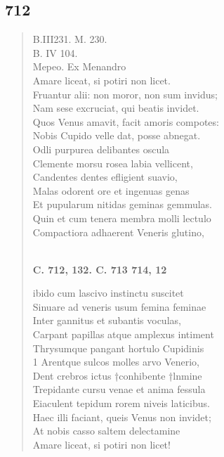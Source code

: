 \documentclass[11pt, a4paper]{report}
\begin{document}
            \subsection*{712}
      \begin{verse}
      B.III231. M. 230. \\ B. IV 104. \\ Mepeo. Ex Menandro \\ Amare liceat, si potiri non licet. \\ Fruantur alii: non moror, non sum invidus; \\ Nam sese excruciat, qui beatis invidet. \\ Quos Venus amavit, facit amoris compotes: \\ Nobis Cupido velle dat, posse abnegat. \\ Odli purpurea delibantes oscula \\ Clemente morsu rosea labia vellicent, \\ Candentes dentes efligient suavio, \\ Malas odorent ore et ingenuas genas \\ Et pupularum nitidas geminas gemmulas. \\ Quin et cum tenera membra molli lectulo \\ Compactiora adhaerent Veneris glutino, \\ 
        ﻿\pagebreak 
    \begin{center} \textbf{C. 712, 132. C. 713 714, 12} \end{center} \marginpar{[79]} ibido cum lascivo instinctu suscitet \\ Sinuare ad veneris usum femina feminae \\ Inter gannitus et subantis voculas, \\ Carpant papillas atque amplexus intiment \\ Thrysumque pangant hortulo Cupidinis \\ 1 Arentque sulcos molles arvo Venerio, \\ Dent crebros ictus †conhibente †lnmine \\ Trepidante cursu venae et anima fessula \\ Eiaculent tepidum rorem niveis laticibus. \\ Haec illi faciant, queis Venus non invidet; \\ At nobis casso saltem delectamine \\ Amare liceat, si potiri non licet! \\ 
      \end{verse}
  
\end{document}
